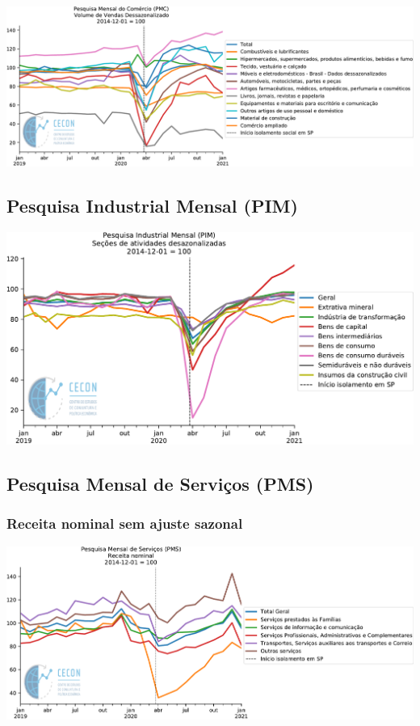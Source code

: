 \documentclass{SelfArx}
\begin{document}
\begin{center}
\includegraphics[width=.9\linewidth]{./figs/Setoriais/PMC_IBGE.pdf}
\end{center}


\subsection*{Pesquisa Industrial Mensal (PIM)}
\label{sec:org9725895}

\begin{center}
\includegraphics[width=.9\linewidth]{./figs/Setoriais/PIM_IBGE.pdf}
\end{center}


\subsection*{Pesquisa Mensal de Serviços (PMS)}
\label{sec:orgaa5c229}
\subsubsection*{Receita nominal sem ajuste sazonal}
\label{sec:org5916131}
\begin{center}
\includegraphics[width=.9\linewidth]{./figs/Setoriais/PMS_IBGE.pdf}
\end{center}
\end{document}
